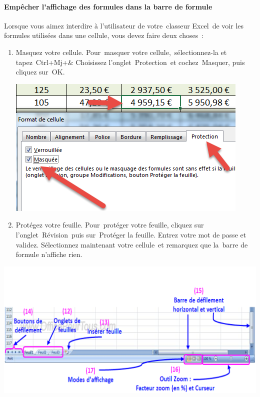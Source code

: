 \paragraph{Empêcher l’affichage des formules dans la barre de formule}{
	Lorsque vous aimez interdire à l’utilisateur de votre classeur Excel de voir les formules utilisées dans une cellule, vous devez faire deux choses :
	\begin{enumerate}
		\item Masquez votre cellule.
			\subitem Pour masquer votre cellule, sélectionnez-la et tapez Ctrl+Mj+\&
			\subitem Choisissez l’onglet Protection et cochez Masquer, puis cliquez sur OK.	
\begin{center} 
	\includegraphics[scale=0.2,width=0.5\linewidth]{img/masquer} 
	 \label{rdp}
	\end{center} 
\item Protégez votre feuille.
	\subitem Pour protéger votre feuille, cliquez sur l’onglet Révision puis sur Protéger la feuille.
	\subitem Entrez votre mot de passe et validez.
	\subitem Sélectionnez maintenant votre cellule et remarquez que la barre de formule n’affiche rien.
	
\end{enumerate}
}
\begin{definition}

\end{definition}
 \begin{center} 
	\includegraphics[scale=0.2,width=\linewidth]{img/barre_etat} 
	 \label{rdp}
\end{center}


